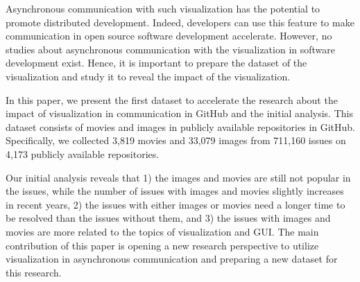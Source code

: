 Asynchronous communication with 
such visualization
has the potential 
to promote distributed development. 
Indeed, developers can use this feature to make communication 
in open source software development accelerate. 
However, no studies about asynchronous communication with 
the visualization in software development exist.
Hence, it is important to prepare the dataset of the visualization 
and study it to reveal the impact of the visualization.



In this paper, we present the first dataset to accelerate 
the research about the impact of visualization 
in communication in GitHub and the initial analysis. 
This dataset consists of movies and images 
in publicly available repositories in GitHub. 
Specifically, we collected 
3,819 movies and 
33,079 images from 
711,160 issues on
4,173 publicly available repositories.

Our initial analysis reveals that 
1) the images and movies are still not popular 
in the issues, while the number of issues with images 
and movies slightly increases in recent years, 
2) the issues with either images or movies need 
a longer time to be resolved than the issues without them, and 
3) the issues with images and movies are more related to 
the topics of visualization and GUI. 
The main contribution of this paper is 
opening a new research perspective to utilize visualization 
in asynchronous communication and 
preparing a new dataset for this research. 